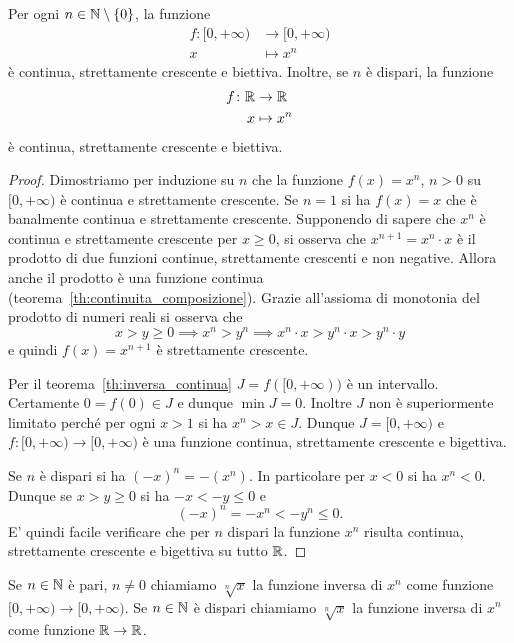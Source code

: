 \begin{theorem}
\mymark{*}%
%
Per ogni $n\in \mathbb N\setminus{\left\{ 0 \right\}}$, la funzione
\begin{align*}
  f\colon [0,+\infty) &\to [0,+\infty)\\
   x &\mapsto x^n
\end{align*}
è continua, strettamente crescente e biettiva.
Inoltre, se $n$ è dispari, la funzione
\begin{align*}
  f\colon \mathbb R & \to \mathbb R\\
    x &\mapsto x^n
\end{align*}
è continua, strettamente crescente e biettiva.
\end{theorem}
%
\begin{proof}
Dimostriamo per induzione su $n$
che la funzione $f(x)=x^n$, $n>0$
su $[0,+\infty)$ è continua e strettamente crescente.
Se $n=1$ si ha $f(x)=x$ che è banalmente continua e strettamente crescente.
Supponendo di sapere che $x^n$ è continua e
strettamente crescente per $x\ge 0$,
si osserva che $x^{n+1} = x^n \cdot x$ è il prodotto
di due funzioni continue, strettamente crescenti e non negative.
Allora anche il prodotto è una funzione continua
(teorema~\ref{th:continuita_composizione}).
Grazie all'assioma di monotonia del prodotto di numeri reali si
osserva che
\[
  x>y\ge 0
  \implies x^n>y^n
  \implies x^n \cdot x > y^n \cdot x > y^n \cdot y
\]
e quindi $f(x)=x^{n+1}$ è strettamente crescente.

Per il teorema~\ref{th:inversa_continua}
$J=f([0,+\infty))$
è un intervallo.
Certamente $0=f(0)\in J$ e dunque $\min J=0$.
Inoltre $J$ non è superiormente limitato
perché per ogni $x>1$ si ha $x^n>x\in J$.
Dunque $J=[0,+\infty)$ e
$f\colon [0,+\infty)\to [0,+\infty)$
è una funzione continua, strettamente crescente e
bigettiva.

Se $n$ è dispari si ha $(-x)^n = -(x^n)$.
In particolare per $x<0$ si ha $x^n<0$.
Dunque se $x> y \ge 0$ si
ha $-x < -y \le 0$ e
\[
  (-x)^n = -x^n < -y^n \le 0.
\]
E' quindi facile verificare che per $n$ dispari
la funzione $x^n$
risulta continua, strettamente crescente e bigettiva su tutto $\mathbb R$.
\end{proof}

\begin{definition}
\mymark{***}
Se $n\in \mathbb N$ è pari, $n\neq 0$
chiamiamo $\sqrt[n]{x}$ la funzione
inversa di $x^n$ come funzione $[0,+\infty)\to [0,+\infty)$.
Se $n\in \mathbb N$ è dispari chiamiamo $\sqrt[n]{x}$
la funzione inversa di $x^n$ come funzione $\mathbb R \to \mathbb R$.
\end{definition}

